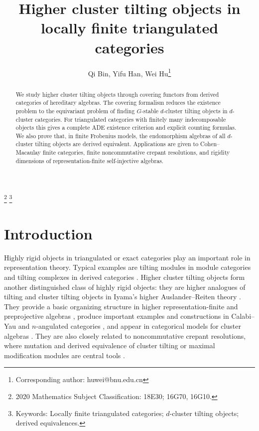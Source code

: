 \documentclass[12pt]{article}
\title{Higher cluster tilting objects in locally finite triangulated categories}
\author{Qi Bin, Yifu Han, Wei Hu\thanks{Corresponding author: huwei@bnu.edu.cn}
}
\date{}
\theoremstyle{plain}
\theoremstyle{definition}
\begin{document}
\maketitle



\renewcommand{\thefootnote}{\alph{footnote}}
\setcounter{footnote}{-1} \footnote{2020 Mathematics Subject
Classification: 18E30;  16G70, 16G10.}
\renewcommand{\thefootnote}{\alph{footnote}}
\setcounter{footnote}{-1} \footnote{Keywords: Locally finite triangulated categories; $d$-cluster tilting objects;   derived equivalences.}

\begin{abstract}
We study higher cluster tilting objects through covering functors from derived
categories of hereditary algebras.  The covering formalism reduces the
existence problem to the equivariant problem of finding \(G\)-stable
\(d\)-cluster tilting objects in  \(d\)-cluster categories.  For
triangulated categories with finitely many indecomposable objects this gives a
complete ADE existence criterion and explicit counting formulas.  We also prove
that, in finite Frobenius models, the endomorphism algebras of all
\(d\)-cluster tilting objects are derived equivalent.  Applications are given
to Cohen--Macaulay finite categories, finite noncommutative crepant
resolutions, and rigidity dimensions of representation-finite self-injective
algebras.
\end{abstract}


\section{Introduction}

Highly rigid objects in triangulated or exact categories play an important
role in representation theory.  Typical examples are tilting modules in module categories and tilting
complexes in derived categories
\cite{Happel1988aa,Rickard1989ab,Keller2007aa}.  Higher cluster tilting
objects form another distinguished class of highly rigid objects: they are
higher analogues of tilting and cluster tilting objects in Iyama's higher
Auslander--Reiten theory \cite{Iyama2007ab}.  They provide a basic organizing
structure in higher representation-finite and preprojective algebras
\cite{Iyama2011ac,Iyama2013ab}, produce important examples and constructions in
Calabi--Yau and \(n\)-angulated categories
\cite{Keller2008ab,Geiss2013ab}, and appear in categorical models for cluster
algebras \cite{Buan2006aa,Buan2009ab,Buan2011aa}.  They are also closely
related to noncommutative crepant resolutions, where mutation and derived
equivalence of cluster tilting or maximal modification modules are central
tools \cite{VanDenBergh2004,Iyama2008ac,Iyama2013ac,Iyama2013aa}.
\end{document}

